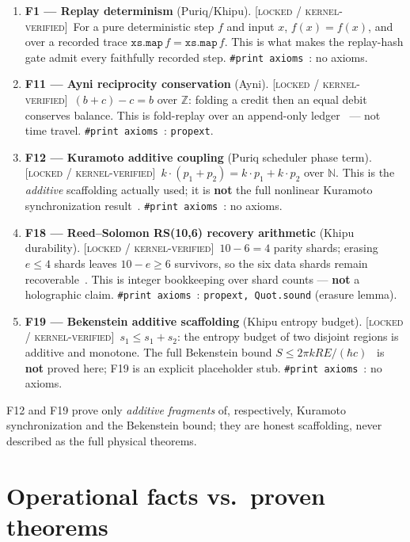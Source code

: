 \documentclass[11pt]{article}
\theoremstyle{plain}
\theoremstyle{definition}
\theoremstyle{remark}
\newcommand{\statusLocked}{\textcolor{szlteal}{\textsc{[locked / kernel-verified]}}}
\newcommand{\printax}[1]{\texttt{\#print axioms}~\texttt{#1}}
\begin{document}
\begin{enumerate}[leftmargin=1.4em]
\item \textbf{F1 --- Replay determinism} (Puriq/Khipu). \statusLocked\ For a pure
deterministic step $f$ and input $x$, $f(x)=f(x)$, and over a recorded trace
$\texttt{xs.map}\,f = \texttt{xs.map}\,f$. This is what makes the replay-hash gate admit
every faithfully recorded step. \printax{}: no axioms.
\item \textbf{F11 --- Ayni reciprocity conservation} (Ayni). \statusLocked\ $(b+c)-c=b$
over $\mathbb{Z}$: folding a credit then an equal debit conserves balance. This is
fold-replay over an append-only ledger~\cite{fowler2005} --- not time travel.
\printax{}: \texttt{propext}.
\item \textbf{F12 --- Kuramoto additive coupling} (Puriq scheduler phase term).
\statusLocked\ $k\cdot(p_1+p_2)=k\cdot p_1+k\cdot p_2$ over $\mathbb{N}$. This is the
\emph{additive} scaffolding actually used; it is \textbf{not} the full nonlinear
Kuramoto synchronization result~\cite{kuramoto1975}. \printax{}: no axioms.
\item \textbf{F18 --- Reed--Solomon RS(10,6) recovery arithmetic} (Khipu durability).
\statusLocked\ $10-6=4$ parity shards; erasing $e\le 4$ shards leaves $10-e\ge 6$
survivors, so the six data shards remain recoverable~\cite{reedsolomon1960,singleton1964}.
This is integer bookkeeping over shard counts --- \textbf{not} a holographic claim.
\printax{}: \texttt{propext, Quot.sound} (erasure lemma).
\item \textbf{F19 --- Bekenstein additive scaffolding} (Khipu entropy budget).
\statusLocked\ $s_1\le s_1+s_2$: the entropy budget of two disjoint regions is additive
and monotone. The full Bekenstein bound $S\le 2\pi kRE/(\hbar c)$~\cite{bekenstein1981}
is \textbf{not} proved here; F19 is an explicit placeholder stub. \printax{}: no axioms.
\end{enumerate}

F12 and F19 prove only \emph{additive fragments} of, respectively, Kuramoto
synchronization and the Bekenstein bound; they are honest scaffolding, never described
as the full physical theorems.

\section{Operational facts vs.\ proven theorems}
\label{sec:classes}
\end{document}
